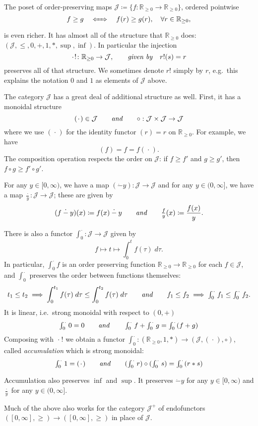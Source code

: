 \documentclass[11pt, one side, article]{memoir}
\theoremstyle{definition}
\theoremstyle{plain}
\newcommand{\cat}[1]{\mathcal{#1}}%
\newcommand{\id}{\mathrm{id}}
\newcommand{\tn}[1]{\textnormal{#1}}
\newcommand{\rr}{\mathbb{R}}
\newcommand{\const}[1][\blank]{#1 !}
\newcommand{\blank}[1][1pt]{\hspace{#1}\cdot\hspace{#1}}
\newcommand{\hh}[2][]{#1 \tn{\textit{#2}} #1}
\newcommand{\qqand}{\hh[\qquad]{and}}
\newcommand{\ifff}[1][\;\;]{#1\xLeftrightarrow{\quad}#1}
\newcommand{\hi}[4][]{#1 #2 \tn{\textit{#4}} #3}
\newcommand{\rrnon}{\rr_{\geq0}}
\newcommand{\dotminus}{\mathbin{\dot{-}}}
\renewcommand{\d}[1]{\;d #1}
\newcommand{\varint}{\textstyle\int}
\newcommand{\intzero}[1][\blank]{\varint_0^{#1}}
\newcommand{\xid}[1][\blank]{(#1)}
\begin{document}
The poset of order-preserving maps $\cat{J}\coloneqq\{f\colon\rrnon\to\rrnon\}$, ordered pointwise
\[
f\geq g\ifff[\quad] f(r)\geq g(r),\quad \forall r\in\rrnon,
\]
is even richer. It has almost all of the structure that $\rrnon$ does: $(\cat{J},\leq,0,+,1,*,\sup,\inf)$. In particular the injection
\[
  \const\colon\rrnon\to\cat{J}
  \hi[,]{\qquad}{\quad}{given by}
  \const[r](s)=r
\]
preserves all of that structure. We sometimes denote $\const[r]$ simply by $r$, e.g.\ this explains the notation $0$ and $1$ as elements of $\cat{J}$ above.

The category $\cat{J}$ has a great deal of additional structure as well. First, it has a monoidal structure
\[
	\xid\in\cat{J}
	\qqand
	\circ:\cat{J}\times\cat{J}\to\cat{J}
\]
where we use $\xid$ for the identity functor $\xid[r]=r$ on $\rrnon$. For example, we have
\[\xid[f]=f=f\xid.\]
The composition operation respects the order on $\cat{J}$: if $f\geq f'$ and $g\geq g'$, then $f\circ g\geq f'\circ g'$. 


For any $y\in[0,\infty)$, we have a map $(\dotminus y)\colon\cat{J}\to\cat{J}$ and for any $y\in(0,\infty]$, we have a map $\frac{\blank}{y}\colon\cat{J}\to\cat{J}$; these are given by
\[
	(f\dotminus y)(x)\coloneqq f(x)\dotminus y
	\qqand
	\textstyle\frac{f}{y}(x)\displaystyle\coloneqq \frac{f(x)}{y}.
\]

There is also a functor $\intzero\colon\cat{J}\to\cat{J}$ given by
\[
f\mapsto t\mapsto\int_0^t f(\tau) \d \tau.
\]
In particular, $\intzero f$ is an order preserving function $\rrnon\to\rrnon$ for each $f\in\cat{J}$, and $\intzero$ preserves the order between functions themselves:
\[
t_1\leq 
t_2
\implies 
\int_0^{t_1}f(\tau)\d\tau\leq
\int_0^{t_2}f(\tau)\d\tau
\qqand
f_1\leq 
f_2
\implies
\intzero f_1\leq
\intzero f_2.
\]
It is linear, i.e.\ strong monoidal with respect to $(0,+)$
\[
\intzero 0=0
\qqand
\intzero f+\intzero g=\intzero (f+g)
\]
Composing with $\const$ we obtain a functor $\intzero\colon(\rrnon,1,*)\to(\cat{J},\xid,\circ)$, called  \emph{accumulation} which is strong monoidal:
\[
\intzero 1=\xid
\qqand
(\intzero r)\circ(\intzero s)=\intzero(r*s)
\]

Accumulation also preserves $\inf$ and $\sup$. It preserves $\dotminus y$ for any $y\in[0,\infty)$ and $\frac{\blank}{y}$ for any $y\in(0,\infty]$.

Much of the above also works for the category $\cat{J}^+$ of endofunctors $([0,\infty],\geq)\to([0,\infty],\geq)$ in place of $\cat{J}$. 
\end{document}
